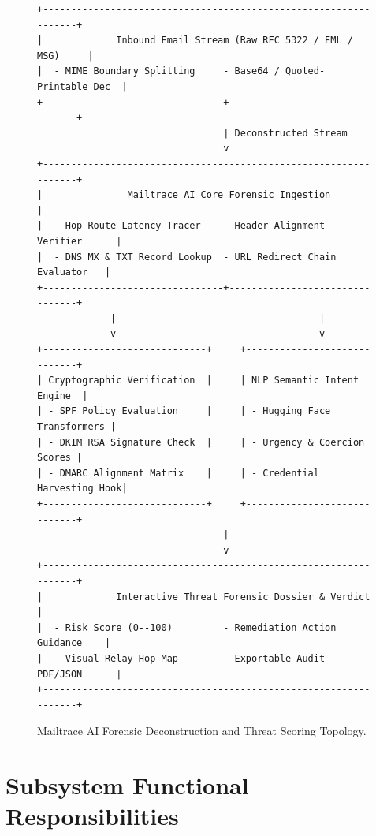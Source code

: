 \documentclass[12pt,a4paper]{report}
\begin{document}
\begin{figure}[htbp]
\centering
\footnotesize
\begin{verbatim}
+-----------------------------------------------------------------+
|             Inbound Email Stream (Raw RFC 5322 / EML / MSG)     |
|  - MIME Boundary Splitting     - Base64 / Quoted-Printable Dec  |
+--------------------------------+--------------------------------+
                                 | Deconstructed Stream
                                 v
+-----------------------------------------------------------------+
|               Mailtrace AI Core Forensic Ingestion              |
|  - Hop Route Latency Tracer    - Header Alignment Verifier      |
|  - DNS MX & TXT Record Lookup  - URL Redirect Chain Evaluator   |
+--------------------------------+--------------------------------+
             |                                    |
             v                                    v
+-----------------------------+     +-----------------------------+
| Cryptographic Verification  |     | NLP Semantic Intent Engine  |
| - SPF Policy Evaluation     |     | - Hugging Face Transformers |
| - DKIM RSA Signature Check  |     | - Urgency & Coercion Scores |
| - DMARC Alignment Matrix    |     | - Credential Harvesting Hook|
+-----------------------------+     +-----------------------------+
                                 |
                                 v
+-----------------------------------------------------------------+
|             Interactive Threat Forensic Dossier & Verdict       |
|  - Risk Score (0--100)         - Remediation Action Guidance    |
|  - Visual Relay Hop Map        - Exportable Audit PDF/JSON      |
+-----------------------------------------------------------------+
\end{verbatim}
\caption{Mailtrace AI Forensic Deconstruction and Threat Scoring Topology.}
\label{fig:mailtrace_topology}
\end{figure}

\section{Subsystem Functional Responsibilities}
\end{document}

